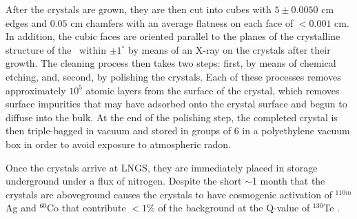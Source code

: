 After the crystals are grown, they are then cut into cubes with $5 \pm 0.0050$ cm edges and $0.05$ cm chamfers with an average flatness on each face of $<0.001$ cm.
In addition, the cubic faces are oriented parallel to the planes of the crystalline structure of the \teotwo~within $\pm1^{\circ}$ by means of an X-ray on the crystals after their growth.
The cleaning process then takes two steps: first, by means of chemical etching, and, second, by polishing the crystals.
Each of these processes removes approximately $10^5$ atomic layers from the surface of the crystal, which removes surface impurities that may have adsorbed onto the crystal surface and begun to diffuse into the bulk.
At the end of the polishing step, the completed crystal is then triple-bagged in vacuum and stored in groups of 6 in a polyethylene vacuum box in order to avoid exposure to atmospheric radon.

Once the crystals arrive at LNGS, they are immediately placed in storage underground under a flux of nitrogen.
Despite the short $\sim$1 month that the crystals are aboveground causes the crystals to have cosmogenic activation of $^{110m}$Ag and $^{60}$Co that contribute $<1\%$ of the background at the Q-value of $^{130}$Te \cite{PhysRevC.92.024620, BARGHOUTY201316}.

